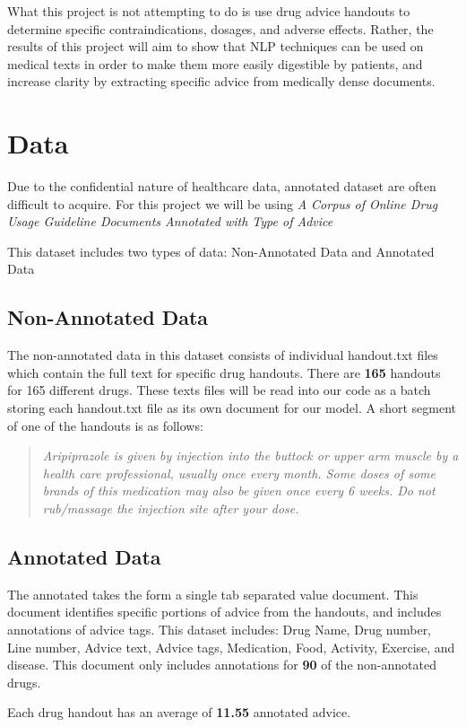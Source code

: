 \documentclass[11pt]{article}
\begin{document}
What this project is not attempting to do is use drug advice handouts to determine specific contraindications, dosages, and adverse effects. Rather, the results of this project will aim to show that NLP techniques can be used on medical texts in order to make them more easily digestible by patients, and increase clarity by extracting specific advice from medically dense documents.

\section{Data}
Due to the confidential nature of healthcare data, annotated dataset are often difficult to acquire. For this project we will be using \textit{A Corpus of Online Drug Usage Guideline Documents Annotated with Type of Advice}

This dataset includes two types of data: Non-Annotated Data and Annotated Data
\subsection{Non-Annotated Data}
The non-annotated data in this dataset consists of individual handout.txt files which contain the full text for specific drug handouts. There are \textbf{165} handouts for 165 different drugs. These texts files will be read into our code as a batch storing each handout.txt file as its own document for our model. A short segment of one of the handouts is as follows:
\begin{quote}
\textit{Aripiprazole is given by injection into the buttock or upper arm muscle by a health care professional, usually once every month. Some doses of some brands of this medication may also be given once every 6 weeks. Do not rub/massage the injection site after your dose.}
\end{quote}

\subsection{Annotated Data}
The annotated takes the form a single tab separated value document. This document identifies specific portions of advice from the handouts, and includes annotations of advice tags. This dataset includes: Drug Name, Drug number, Line number, Advice text, Advice tags, Medication, Food, Activity, Exercise, and disease. This document only includes annotations for \textbf{90} of the non-annotated drugs. 

Each drug handout has an average of \textbf{11.55} annotated advice.
\end{document}
